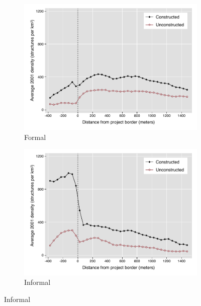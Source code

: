 \documentclass[12pt]{article}
\begin{document}
\begin{figure}
        \begin{subfigure}[b]{0.495\textwidth}
            \centering
        \caption{Formal}
            \includegraphics[width=\textwidth,trim={0.3cm .3cm 0.1cm 0cm}, clip=true]{figures/bblu_for_pre_means_4}
        \end{subfigure}
        \hfill
        \begin{subfigure}[b]{0.495\textwidth}  
            \centering 
        \caption{ Informal}
            \includegraphics[width=\textwidth,trim={0.3cm .3cm 0.1cm 0cm}, clip=true]{figures/bblu_inf_pre_means_4.pdf}
        \end{subfigure}

\end{figure}
\end{document}

